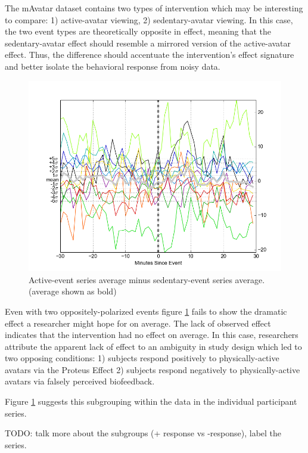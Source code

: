 The mAvatar dataset contains two types of intervention which may be interesting to compare: 1) active-avatar viewing, 2) sedentary-avatar viewing.
In this case, the two event types are theoretically opposite in effect, meaning that the sedentary-avatar effect should resemble a mirrored version of the active-avatar effect.
Thus, the difference should accentuate the intervention's effect signature and better isolate the behavioral response from noisy data.

\begin{figure}
\centering
\includegraphics[width=0.9\columnwidth]{./img/mAvatar_difference_events.png}
\caption{Active-event series average minus sedentary-event series average. (average shown as bold)}
\label{fig:mAvatarDifference}
\end{figure}

Even with two oppositely-polarized events figure \ref{fig:mAvatarDifference} fails to show the dramatic effect a researcher might hope for on average.
The lack of observed effect indicates that the intervention had no effect on average.
In this case, researchers attribute the apparent lack of effect to an ambiguity in study design which led to two opposing conditions: 1) subjects respond positively to physically-active avatars via the Proteus Effect \cite{???} 2) subjects respond negatively to physically-active avatars via falsely perceived biofeedback.

Figure \ref{fig:mAvatarDifference} suggests this subgrouping within the data in the individual participant series.

TODO: talk more about the subgroups (+ response vs -response), label the series.

